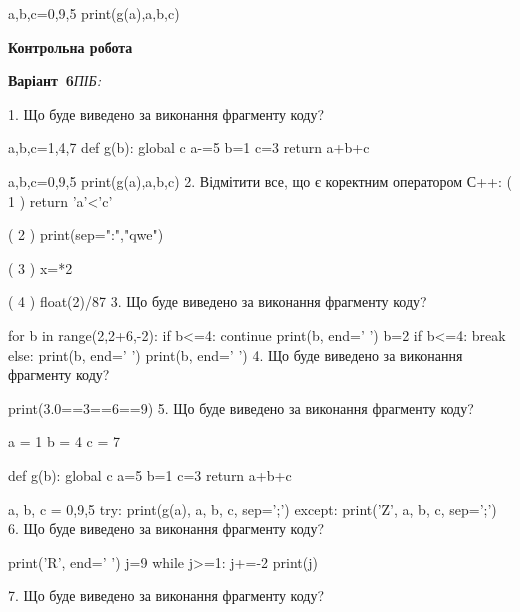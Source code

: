 \documentclass[11pt]{article}
\begin{document}
a,b,c=0,9,5
print(g(a),a,b,c)
\vspace{5mm}










\newpage

\newpage

{\large\textbf{Контрольна робота}}

\textbf{Варіант \No\,6}\hfill \textit{ПІБ:}\,\underline{\hspace{60mm}}
\vspace{4mm}

1. Що буде виведено за виконання фрагменту коду?

a,b,c=1,4,7
def g(b):
global c    a-=5
    b=1
    c=3
    return a+b+c

a,b,c=0,9,5
print(g(a),a,b,c)
\vspace{5mm}
2. %
Відмітити все, що є коректним оператором С++:
( 1 ) return 'a'<'c'

( 2 ) print(sep=":","qwe")

( 3 ) x=*2

( 4 ) float(2)/87
\vspace{5mm}
3. Що буде виведено за виконання фрагменту коду?

for b in range(2,2+6,-2):
    if b<=4:
        continue
    print(b, end=' ')
    b=2
    if b<=4:
        break
else:
    print(b, end=' ')
print(b, end=' ')
\vspace{5mm}
4. Що буде виведено за виконання фрагменту коду?

print(3.0==3==6==9)
\vspace{5mm}
5. Що буде виведено за виконання фрагменту коду?

a = 1
b = 4
c = 7

def g(b):
global c    a=5
    b=1
    c=3
    return a+b+c

a, b, c = 0,9,5
try:
    print(g(a), a, b, c, sep=';')
except:
    print('Z', a, b, c, sep=';')
\vspace{5mm}
6. Що буде виведено за виконання фрагменту коду?

print('R', end=' ')
j=9
while j>=1:
    j+=-2
print(j)

\vspace{5mm}
7. Що буде виведено за виконання фрагменту коду?
\end{document}
